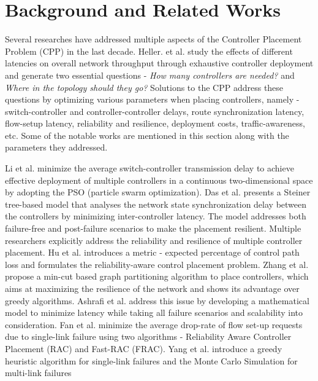 \documentclass[final,5p,times]{cas-dc}
\begin{document}
	\section{Background and Related Works} \label{background}
	Several researches have addressed multiple aspects of the Controller Placement Problem (CPP) in the last decade. Heller. et al. \cite{heller2012latency} study the effects of different latencies on overall network throughput through exhaustive controller deployment and generate two essential questions - \textit{How many controllers are needed?} and \textit{Where in the topology should they go?} Solutions to the CPP address these questions by optimizing various parameters when placing controllers, namely - switch-controller and controller-controller delays, route synchronization latency, flow-setup latency, reliability and resilience, deployment costs, traffic-awareness, etc. Some of the notable works are mentioned in this section along with the parameters they addressed.
	
	Li et al. \cite{li2020latency} minimize the average switch-controller transmission delay to achieve effective deployment of multiple controllers in a continuous two-dimensional space by adopting the PSO (particle swarm optimization). Das et al. \cite{das2020latency} presents a Steiner tree-based model that analyses the network state synchronization delay between the controllers by minimizing inter-controller latency. The model addresses both failure-free and post-failure scenarios to make the placement resilient. Multiple researchers explicitly address the reliability and resilience of multiple controller placement. Hu et al. \cite{hu2013reliability} introduces a metric - expected percentage of control path loss and formulates the reliability-aware control placement problem. Zhang et al. \cite{zhang2011resilience} propose a min-cut based graph partitioning algorithm to place controllers, which aims at maximizing the resilience of the network and shows its advantage over greedy algorithms. Ashrafi et al. \cite{ashrafi2020reliability} address this issue by developing a mathematical model to minimize latency while taking all failure scenarios and scalability into consideration. Fan et al. \cite{fan2020reliability} minimize the average drop-rate of flow set-up requests due to single-link failure using two algorithms - Reliability Aware Controller Placement (RAC) and Fast-RAC (FRAC). Yang et al. \cite{yang2020security} introduce a greedy heuristic algorithm for single-link failures and the Monte Carlo Simulation for multi-link failures
	
\end{document}
